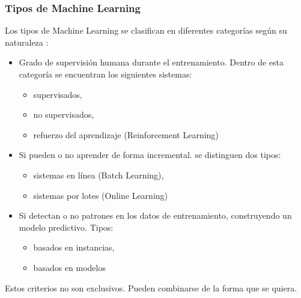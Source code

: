 \documentclass[12pt,a4paper,Spanish]{article}
\begin{document}
\subsubsection{Tipos de Machine Learning}
Los tipos de Machine Learning se clasifican en diferentes categorías según su naturaleza \cite{geron2022hands}:
\begin{itemize}
	\item Grado de supervisión humana durante el entrenamiento. Dentro de esta categoría se encuentran los siguientes sistemas:
	\begin{itemize}
		\item supervisados,
		\item no supervisados,
		\item refuerzo del aprendizaje (Reinforcement Learning)
	\end{itemize}
	\item Si pueden o no aprender de forma incremental. se distinguen dos tipos:
	\begin{itemize}
		\item sistemas en línea (Batch Learning),
		\item sistemas por lotes (Online Learning)
	\end{itemize}
	\item Si detectan o no patrones en los datos de entrenamiento, construyendo un modelo predictivo. Tipos:
	\begin{itemize}
		\item basados en instancias,
		\item basados en modelos
	\end{itemize}
\end{itemize}
Estos criterios no son exclusivos. Pueden combinarse de la forma que se quiera.
\end{document}
